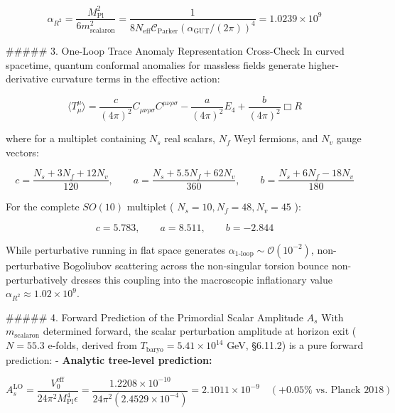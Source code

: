 \documentclass[11pt,a4paper]{article}
\theoremstyle{definition}
\theoremstyle{remark}
\begin{document}
\begin{equation}
\boxed{\alpha_{R^2} = \frac{M_{\text{Pl}}^2}{6 m_{\text{scalaron}}^2} = \frac{1}{8 N_{\text{eff}} \mathcal{C}_{\text{Parker}} (\alpha_{\text{GUT}} / (2\pi))^4} = 1.0239 \times 10^9}
\end{equation}


\#\#\#\#\# 3. One-Loop Trace Anomaly Representation Cross-Check
In curved spacetime, quantum conformal anomalies for massless fields generate higher-derivative curvature terms in the effective action:


\begin{equation}
\langle T^\mu_\mu \rangle = \frac{c}{(4\pi)^2} C_{\mu\nu\rho\sigma} C^{\mu\nu\rho\sigma} - \frac{a}{(4\pi)^2} E_4 + \frac{b}{(4\pi)^2} \Box R
\end{equation}


where for a multiplet containing $N_s$ real scalars, $N_f$ Weyl fermions, and $N_v$ gauge vectors:


\begin{equation}
c = \frac{N_s + 3 N_f + 12 N_v}{120}, \qquad a = \frac{N_s + 5.5 N_f + 62 N_v}{360}, \qquad b = \frac{N_s + 6 N_f - 18 N_v}{180}
\end{equation}


For the complete $SO(10)$ multiplet ( $N_s = 10, N_f = 48, N_v = 45$ ):


\begin{equation}
c = 5.783, \qquad a = 8.511, \qquad b = -2.844
\end{equation}


While perturbative running in flat space generates $\alpha_{\text{1-loop}} \sim \mathcal{O}(10^{-2})$, non-perturbative Bogoliubov scattering across the non-singular torsion bounce non-perturbatively dresses this coupling into the macroscopic inflationary value $\alpha_{R^2} \approx 1.02 \times 10^9$.

\#\#\#\#\# 4. Forward Prediction of the Primordial Scalar Amplitude $A_s$
With $m_{\text{scalaron}}$ determined forward, the scalar perturbation amplitude at horizon exit ( $N = 55.3$ e-folds, derived from $T_{\text{baryo}} = 5.41 \times 10^{14}$ GeV, \S 6.11.2) is a pure forward prediction:
- \textbf{Analytic tree-level prediction:}


\begin{equation}
A_s^{\text{LO}} = \frac{V_0^{\text{eff}}}{24\pi^2 M_{\text{Pl}}^4 \epsilon} = \frac{1.2208 \times 10^{-10}}{24\pi^2 (2.4529 \times 10^{-4})} = 2.1011 \times 10^{-9} \quad (\mathbf{+0.05\%} \text{ vs. Planck 2018})
\end{equation}
\end{document}
